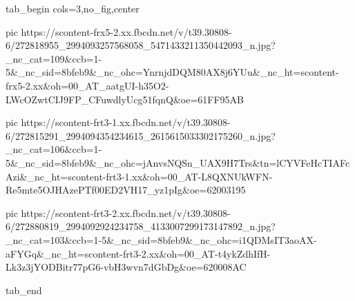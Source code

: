  
 
 
 
 


\ifcmt
  tab_begin cols=3,no_fig,center

     pic https://scontent-frx5-2.xx.fbcdn.net/v/t39.30808-6/272818955_2994093257568058_5471433211350442093_n.jpg?_nc_cat=109&ccb=1-5&_nc_sid=8bfeb9&_nc_ohc=YnrnjdDQM80AX8j6YUu&_nc_ht=scontent-frx5-2.xx&oh=00_AT_aatgUI-h35O2-LWcOZwtCIJ9FP_CFuwdlyUcg51fqnQ&oe=61FF95AB

     pic https://scontent-frt3-1.xx.fbcdn.net/v/t39.30808-6/272815291_2994094354234615_2615615033302175260_n.jpg?_nc_cat=106&ccb=1-5&_nc_sid=8bfeb9&_nc_ohc=jAnvsNQSn_UAX9H7Trs&tn=lCYVFeHcTIAFcAzi&_nc_ht=scontent-frt3-1.xx&oh=00_AT-L8QXNUkWFN-Re5mte5OJHAzePTf00ED2VH17_yz1pIg&oe=62003195

     pic https://scontent-frt3-2.xx.fbcdn.net/v/t39.30808-6/272880819_2994092924234758_4133007299173147892_n.jpg?_nc_cat=103&ccb=1-5&_nc_sid=8bfeb9&_nc_ohc=i1QDMsIT3aoAX-aFYGq&_nc_ht=scontent-frt3-2.xx&oh=00_AT-t4ykZdhIfH-Lk3z3jYODBitr77pG6-vbH3wvn7dGbDg&oe=620008AC

  tab_end
\fi
